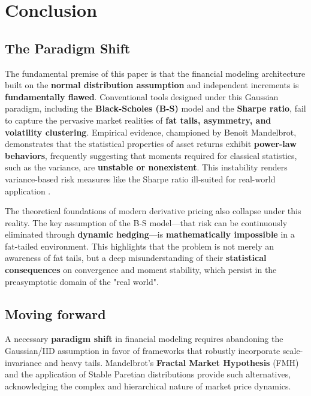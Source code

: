 \documentclass{ieeetj}
\begin{document}
\section{Conclusion}

\subsection{The Paradigm Shift}

The fundamental premise of this paper is that the financial modeling architecture built on the \textbf{normal distribution assumption} and independent increments is \textbf{fundamentally flawed}. Conventional tools designed under this Gaussian paradigm, including the \textbf{Black-Scholes (B-S)} model and the \textbf{Sharpe ratio}, fail to capture the pervasive market realities of \textbf{fat tails, asymmetry, and volatility clustering}. Empirical evidence, championed by Benoit Mandelbrot, demonstrates that the statistical properties of asset returns exhibit \textbf{power-law behaviors}, frequently suggesting that moments required for classical statistics, such as the variance, are \textbf{unstable or nonexistent}. This instability renders variance-based risk measures like the Sharpe ratio ill-suited for real-world application .

The theoretical foundations of modern derivative pricing also collapse under this reality. The key assumption of the B-S model—that risk can be continuously eliminated through \textbf{dynamic hedging}—is \textbf{mathematically impossible} in a fat-tailed environment. This highlights that the problem is not merely an awareness of fat tails, but a deep misunderstanding of their \textbf{statistical consequences} on convergence and moment stability, which persist in the preasymptotic domain of the "real world".

\subsection{Moving forward}
A necessary\textbf{ paradigm shift} in financial modeling requires abandoning the Gaussian/IID assumption in favor of frameworks that robustly incorporate scale-invariance and heavy tails. Mandelbrot’s \textbf{Fractal Market Hypothesis} (FMH) and the application of Stable Paretian distributions provide such alternatives, acknowledging the complex and hierarchical nature of market price dynamics.
\end{document}
